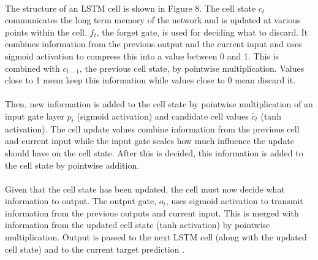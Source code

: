 \documentclass[11pt]{article}
\begin{document}
                    \begin{multicols*}{2}

                    \paragraph{}
                        The structure of an LSTM cell is shown in Figure 8.
                        The cell state $c_t$ communicates the long term memory of the network and is updated at various points within the cell.  
                        $f_t$, the forget gate, is used for deciding what to discard.
                        It combines information from the previous output and the current input and uses sigmoid activation to compress this into a value between 0 and 1.
                        This is combined with $c_{t-1}$, the previous cell state, by pointwise multiplication.
                        Values close to 1 mean keep this information while values close to 0 mean discard it. 
                        
                    \vspace{-10pt}

                    \paragraph{}
                        Then, new information is added to the cell state by pointwise multiplication of an input gate layer $p_t$ (sigmoid activation) and candidate cell values $\tilde{c_t}$ (tanh activation).
                        The cell update values combine information from the previous cell and current input while the input gate scales how much influence the update should have on the cell state.
                        After this is decided, this information is added to the cell state by pointwise addition.

                    \vspace{-10pt}

                    \paragraph{}
                        Given that the cell state has been updated, the cell must now decide what information to output.
                        The output gate, $o_t$, uses sigmoid activation to transmit information from the previous outputs and current input.
                        This is merged with information from the updated cell state (tanh activation) by pointwise multiplication.
                        Output is passed to the next LSTM cell (along with the updated cell state) and to the current target prediction \cite{Olah15}.
                        

\end{multicols*}
\end{document}
